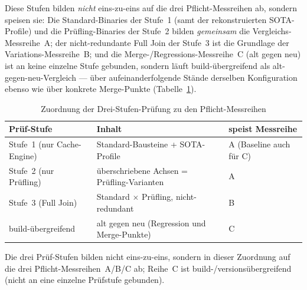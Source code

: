 \begin{nurlang}
Diese Stufen bilden \emph{nicht} eins-zu-eins auf die drei Pflicht-Messreihen ab, sondern speisen sie: Die
Standard-Binaries der Stufe~1 (samt der rekonstruierten SOTA-Profile) und die Prüfling-Binaries der
Stufe~2 bilden \emph{gemeinsam} die Vergleichs-Messreihe~A\@; der nicht-redundante Full Join der Stufe~3 ist
die Grundlage der Variations-Messreihe~B\@; und die Merge-/Regressions-Messreihe~C (alt gegen neu) ist an
keine einzelne Stufe gebunden, sondern läuft build-übergreifend als alt-gegen-neu-Vergleich --- über
aufeinanderfolgende Stände derselben Konfiguration ebenso wie über konkrete Merge-Punkte
(Tabelle~\ref{tab:stage-series}).

\begin{table}[!htbp]
  \centering
  \caption{Zuordnung der Drei-Stufen-Prüfung zu den Pflicht-Messreihen}\label{tab:stage-series}
  \begin{tabular}{@{}lll@{}}
    \toprule
    \textbf{Prüf-Stufe} & \textbf{Inhalt} & \textbf{speist Messreihe} \\
    \midrule
    Stufe~1 (nur Cache-Engine) & Standard-Bausteine + SOTA-Profile & A (Baseline auch für C) \\
    Stufe~2 (nur Prüfling) & überschriebene Achsen = Prüfling-Varianten & A \\
    Stufe~3 (Full Join) & Standard $\times$ Prüfling, nicht-redundant & B \\
    build-übergreifend & alt gegen neu (Regression und Merge-Punkte) & C \\
    \bottomrule
  \end{tabular}

  \smallskip
  {\footnotesize Die drei Prüf-Stufen bilden nicht eins-zu-eins, sondern in dieser Zuordnung auf die
  drei Pflicht-Messreihen~A/B/C ab; Reihe~C ist build-/versionsübergreifend (nicht an eine einzelne
  Prüfstufe gebunden).\par}
\end{table}


\end{nurlang}
